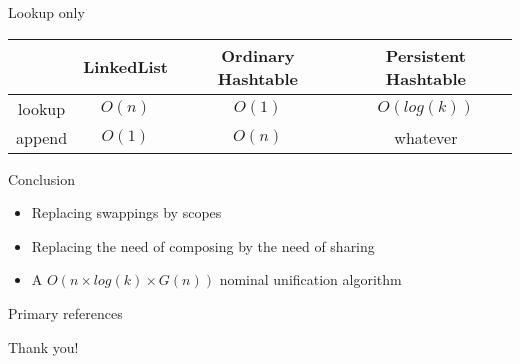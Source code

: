\documentclass[pdf]{beamer}
\begin{document}
\begin{frame}{Lookup only}

  {\centering
    \begin{tabular}{|c|c|c|c|}
      \hline
      & LinkedList & Ordinary Hashtable & Persistent Hashtable \\
      \hline
      lookup & $O(n)$ & $O(1)$ & $O(log(k))$\\
      \hline
      append & $O(1)$ & $O(n)$ & whatever\\
      \hline
    \end{tabular}
  \par}
\end{frame}

\begin{frame}{Conclusion}
  
  {\centering
    \begin{itemize}
  \item Replacing swappings by scopes
  \item Replacing the need of composing by the need of sharing
  \item A $O(n \times log(k) \times G(n))$ nominal unification algorithm
    \end{itemize}
    \par}
\end{frame}
 
\begin{frame}{Primary references}


\end{frame}

\begin{frame}
  \begin{center}
    \Huge Thank you!
   \end{center}
\end{frame}
  
\end{document}

